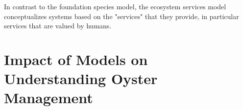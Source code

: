 \documentclass{article}
\begin{document}

In contrast to the foundation species model, the ecosystem services model conceptualizes systems based on the "services" that they provide, in particular services that are valued by humans. 

\section{Impact of Models on Understanding Oyster Management}



\end{document}
